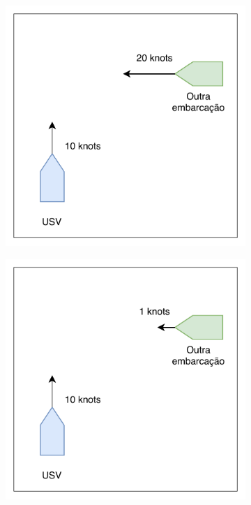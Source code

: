     \begin{figure}
		\centering
        \begin{subfigure}{0.4\textwidth}
            \centering
            \includegraphics[width=\textwidth]{fig/chap1/kuwata_image_collision.pdf}
            \caption{}
            \label{fig:Kuwata2014_colregApplicable}
        \end{subfigure}
        \begin{subfigure}{0.4\textwidth}
            \centering
            \includegraphics[width=\textwidth]{fig/chap1/kuwata_image_safe.pdf}
            \caption{}
            \label{fig:Kuwata2014_colregNA}
        \end{subfigure}
    

\end{figure}
